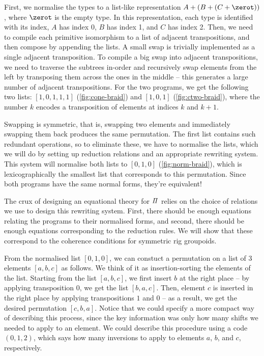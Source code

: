 First, we normalise the types to a list-like representation $A + (B + (C + \zerot))$, where $\zerot$ is the empty type.
In this representation, each type is identified with its index, $A$ has index 0, $B$ has index 1, and $C$ has index 2.
Then, we need to compile each primitive isomorphism to a list of adjacent transpositions, and then compose by appending
the lists. A small swap is trivially implemented as a single adjacent transposition. To compile a big swap into adjacent
transpositions, we need to traverse the subtrees in-order and recursively swap elements from the left by transposing
them across the ones in the middle -- this generates a large number of adjacent transpositions. For the two programs, we
get the following two lists: $[1,0,1,1,1]$ (\cref{fig:cone-braid}) and $[1,0,1]$ (\cref{fig:ctwo-braid}), where the
number $k$ encodes a transposition of elements at indices $k$ and $k+1$.

Swapping is symmetric, that is, swapping two elements and immediately swapping them back produces the same permutation.
The first list contains such redundant operations, so to eliminate these, we have to normalise the lists, which we will
do by setting up reduction relations and an appropriate rewriting system. This system will normalise both lists to
$[0,1,0]$ (\cref{fig:norm-braid}), which is lexicographically the smallest list that corresponds to this permutation.
Since both programs have the same normal forms, they're equivalent!

The crux of designing an equational theory for $\mathit{\Pi}$ relies on the choice of relations we use to design this
rewriting system. First, there should be enough equations relating the programs to their normalised forms, and second,
there should be enough equations corresponding to the reduction rules. We will show that these correspond to the
coherence conditions for symmetric rig groupoids.

From the normalised list $[0,1,0]$, we can constuct a permutation on a list of 3 elements $[a,b,c]$ as follows. We think
of it as insertion-sorting the elements of the list. Starting from the list $[a, b, c]$, we first insert $b$ at the
right place -- by applying transposition $0$, we get the list $[b, a, c]$. Then, element $c$ is inserted in the right
place by applying transpositions $1$ and $0$ -- as a result, we get the desired permutation $[c, b, a]$. Notice that we
could specify a more compact way of describing this process, since the key information was only how many shifts we
needed to apply to an element. We could describe this procedure using a code $(0, 1, 2)$, which says how many inversions
to apply to elements $a$, $b$, and $c$, respectively.

